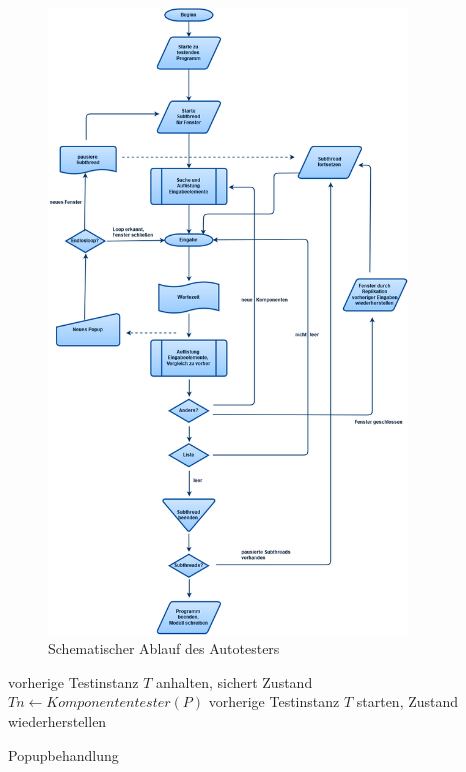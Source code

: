 \begin{figure}
	\centering
	\includegraphics[width=0.85\textwidth]{bilder/autotester.png}
	\caption{Schematischer Ablauf des Autotesters}
	\label{fig:autotesterschematic}
\end{figure}

\begin{algorithm} \SetAlgoLined
	vorherige Testinstanz $T$ anhalten, sichert Zustand\;
	$Tn \longleftarrow Komponententester(P)$\;
	vorherige Testinstanz $T$ starten, Zustand wiederherstellen\;
	\caption{Popupbehandlung}
	\label{alg:autotesterpopup}
\end{algorithm}

